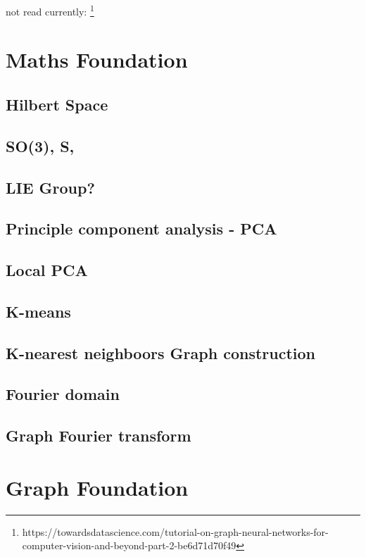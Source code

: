 not read currently:
\footnote{https://towardsdatascience.com/tutorial-on-graph-neural-networks-for-computer-vision-and-beyond-part-2-be6d71d70f49}


\section{Maths Foundation}
\subsection{Hilbert Space}
\subsection{SO(3), S,}
\subsection{LIE Group?}
\subsection{Principle component analysis - PCA}
\subsection{Local PCA}
\subsection{K-means}
\subsection{K-nearest neighboors Graph construction}
\subsection{Fourier domain}

\subsection{Graph Fourier transform}


\section{Graph Foundation}
